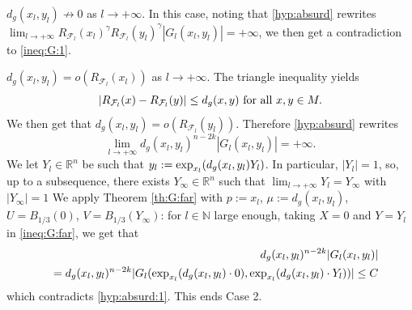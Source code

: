 \documentclass[reqno]{amsart}
\def \rn {\mathbb{R}^n}
\def \nn {\mathbb{N}}
\def \F {{\mathcal F}}
\begin{document}
\smallskip{} $d_g(x_l,y_l)\not\to 0$ as $l\to +\infty$. In this case, noting that  \eqref{hyp:absurd} rewrites  $\lim_{l\to +\infty}R_{\F_l}(x_l)^\gamma R_{\F_l}(y_l)^\gamma |G_l(x_l,y_l)| =+\infty$, we then get a contradiction to \eqref{ineq:G:1}.

\smallskip{} $d_g(x_l, y_l)=o(R_{\F_l}(x_l))$ as $l\to +\infty$. The triangle inequality yields
\begin{equation}\label{ineq:tri}
|R_{\F_l}(x)-R_{\F_l}(y)|\leq d_g(x,y)\hbox{ for all }x,y\in M.
\end{equation}
We then get that $d_g(x_l,y_l)=o(R_{\F_l}(y_l))$. Therefore
\eqref{hyp:absurd} rewrites
\begin{equation}\label{hyp:absurd:1}
\lim_{l\to +\infty} d_g(x_l,y_l)^{n-2k}|G_l(x_l,y_l)|=+\infty.
\end{equation}
We let $Y_l\in\rn$ be such that $y_l:=\hbox{exp}_{x_l}(d_g(x_l, y_l)Y_l)$. In particular, $|Y_l|=1$, so, up to a subsequence, there exists $Y_\infty\in\rn$ such that $\lim_{l\to +\infty}Y_l=Y_\infty$ with $|Y_\infty|=1$
We apply Theorem \ref{th:G:far} with $p:=x_l$, $\mu:=d_g(x_l, y_l)$, $U=B_{1/3}(0)$, $V=B_{1/3}(Y_\infty)$: for $l\in\nn$ large enough, taking $X=0$ and $Y=Y_l$ in \eqref{ineq:G:far}, we get that
\begin{eqnarray*}
&&d_g(x_l, y_l)^{n-2k}|G_l(x_l,y_l )|\\
&&=d_g(x_l, y_l)^{n-2k}|G_l(\hbox{exp}_{x_l}(d_g(x_l, y_l)\cdot 0),\hbox{exp}_{x_l}(d_g(x_l, y_l)\cdot Y_l) )|\leq C
\end{eqnarray*}
which contradicts \eqref{hyp:absurd:1}. This ends Case 2.
 
\end{document}
